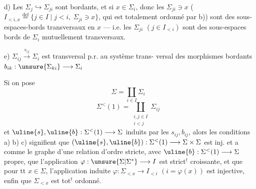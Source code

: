 d)  Les $\Sigma_j\hookrightarrow\Sigma_{ji}$ sont bordants, et si
$x\in\Sigma_i$,  donc les $\Sigma_{ji}\ni x$ (
\deleted{$\unsure{\Sigma}$} $I_{<i,x}\overset{\mathrm{def}}{=}\{j\in I\mid j<i,\ \Sigma_{ji}\ni x\}$,
qui est totalement ordonné par b)) sont
des sous-espaces-bords transversaux en $x$
--- i.e. les $\Sigma_{ji}$ $(j\in I_{<i})$ sont des
sous-espaces bords de $\Sigma_i$ mutuellement
transversaux.

e) $\Sigma_{ij}\xrightarrow{s_{ij}}\Sigma_i$ est transversal p.r. au système trans-
versal des morphismes bordants
$b_{ik}:\unsure{\Sigma_{ki}}\longrightarrow\Sigma_i$

Si on pose
\[
\Sigma=\coprod_{i\in I}\Sigma_i
\]
\[
\Sigma^{<}(1)=\coprod_{\substack{i,j\in I\\i<j}}\Sigma_{ij}
\]
et $\uline{s},\uline{b}:\Sigma^{<}(1)\longrightarrow\Sigma$ induits par les
$s_{ij},b_{ij}$, alors les conditions a) b) c)
signifient que $(\uline{s},\uline{b}):\Sigma^{<}(1)\longrightarrow\Sigma\times\Sigma$ est
inj. et a comme  le graphe d'une
relation d'ordre stricte, avec $\uline{b}:\Sigma^{<}(1)\longrightarrow\Sigma$
 propre,  que l'application  $\varphi:\unsure{\Sigma|\Sigma^{*}}\longrightarrow I$
est strict${}^t$ croissante, et que pour tt $x\in\Sigma$,
l'application induite $\varphi:\Sigma_{<x}\longrightarrow I_{<i}$ $(i=\varphi(x))$ est
injective, enfin que $\Sigma_{<x}$ est tot${}^t$ ordonné.
